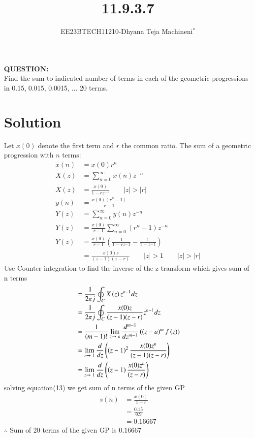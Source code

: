 \documentclass[journal,12pt,twocolumn]{IEEEtran}
\theoremstyle{remark}
\begin{document}

\vspace{3cm}
\title{\textbf{11.9.3.7}}
\author{EE23BTECH11210-Dhyana Teja Machineni$^{*}$%
}
\maketitle
\newpage
\bigskip

\textbf{QUESTION:}\\
Find the sum to indicated number of terms in each of the geometric progressions in
0.15, 0.015, 0.0015, ... 20 terms.
\section*{Solution}
 
Let \( x(0) \) denote the first term and \( r \) the common ratio. The sum of a geometric progression with \( n \) terms:
\begin{align}
x(n) &= x(0)r^n \\
X(z)&= \sum_{n=0}^{\infty}x(n) z^{-n}\\
X(z) &= \frac{x(0)}{1-rz^{-1}} \qquad |z| > |r| \\
y(n)&= \frac{x(0)(r^n-1)}{r-1}\\
Y(z)&= \sum_{n=0}^{\infty} y(n) z^{-n}\\
Y(z)&= \frac{x(0)}{r-1}\sum_{n=0}^{\infty} (r^{n}-1) z^{-n}\\
Y(z)&=\frac{x(0)}{r-1} \left( \frac{1}{1-rz^-1}-\frac{1}{1-z^-1} \right)\\
&=\frac{x(0) z}{(z-1)(z-r)}\qquad |z| > 1  \qquad |z|>|r|
\end{align}
Use Counter integration to find the inverse of the z transform which gives sum of n terms
\begin{align}
&= \frac{1}{2\pi j}\oint_C X\brak{z}z^{n-1}dz\\
&=\frac{1}{2\pi j}\oint_C \frac{x(0) z}{(z-1)(z-r)}z^{n-1} dz\\
&= \frac{1}{\brak{m-1}!}\lim_{z\to\ a}\frac{d^{m-1}}{dz^{m-1}}\brak{\brak{z-a}^m f\brak{z}}\\
 &= \lim_{z\to \ 1}\frac{d}{dz}\brak{\brak{z-1}^2 \frac{x(0) z^n}{(z-1)(z-r)}}\\
 &=\lim_{z\to \ 1}\frac{d}{dz}\brak{\brak{z-1} \frac{x(0) z^n}{(z-r)}}
\end{align}
\hspace{0.5cm}    solving equation(13) we get sum of n terms of the given GP
\begin{align}
    s(n)&= \frac{x(0)}{1-r}\\
    &=\frac{0.15}{0.9}\\
    &=0.16667
\end{align}
        $\therefore$ Sum of 20 terms of the given GP is $0.16667$
       \renewcommand{\thefigure}{\theenumi}
 \renewcommand{\thetable}{\theenumi}
\end{document}
